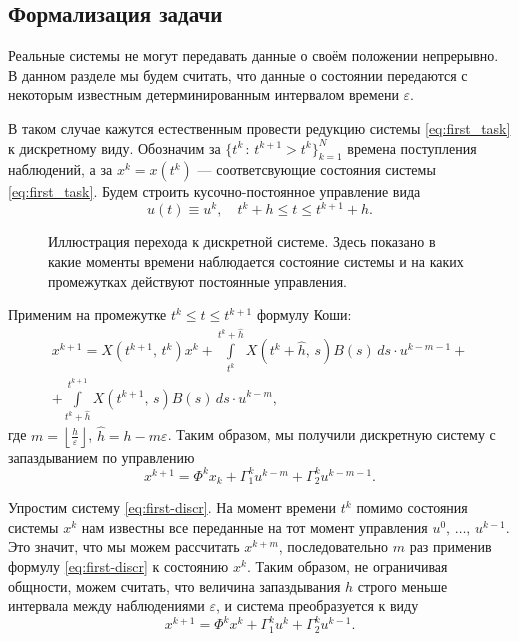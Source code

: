 \subsection{Формализация задачи}

Реальные системы не могут передавать данные о своём положении непрерывно.
В данном разделе мы будем считать, что данные о состоянии передаются с некоторым известным детерминированным интервалом времени $\varepsilon$.

В таком случае кажутся естественным провести редукцию системы \eqref{eq:first_task} к дискретному виду.
Обозначим за $\{t^k\,:\,t^{k+1} > t^k\}_{k=1}^N$ времена поступления наблюдений, а за $x^k = x(t^k)$ --- соответсвующие состояния системы \eqref{eq:first_task}.
Будем строить кусочно-постоянное управление вида
$$
        u(t) \equiv u^{k},
        \quad
        t^{k} + h \leqslant t \leqslant t^{k+1} + h.
$$

\begin{figure}[h]
        \centering
        
        \caption{Иллюстрация перехода к дискретной системе. Здесь показано в какие моменты времени наблюдается состояние системы и на каких промежутках действуют постоянные управления.}
\end{figure}

Применим на промежутке $t^k \leqslant t \leqslant t^{k+1}$ формулу Коши:
\begin{multline*}
x^{k+1} = X(t^{k+1},\,t^k)x^k
+
\int\limits_{t^k}^{t^{k} + \hat h} X(t^{k} + \hat h,\,s)B(s)\,ds\cdot u^{k-m-1}
+\\+
\int\limits_{t^{k} +\hat h}^{t^{k+1}} X(t^{k+1},\,s)B(s)\,ds\cdot u^{k-m},
\end{multline*}
где $m = \left\lfloor\frac{h}{\varepsilon}\right\rfloor$, $\hat h = h - m\varepsilon$.
Таким образом, мы получили дискретную систему с запаздыванием по управлению
\begin{equation}\label{eq:first-discr}
        x^{k+1} = \Phi^k x_k + \Gamma_1^k u^{k-m} + \Gamma_2^k u^{k-m-1}.
\end{equation}

Упростим систему \eqref{eq:first-discr}. На момент времени $t^k$ помимо состояния системы $x^{k}$ нам известны все переданные на тот момент управления $u^0,\,\ldots,\,u^{k-1}$. Это значит, что мы можем рассчитать $x^{k+m}$, последовательно $m$ раз применив формулу \eqref{eq:first-discr} к состоянию $x^k$. Таким образом, не ограничивая общности, можем считать, что величина запаздывания $h$ строго меньше интервала между наблюдениями $\varepsilon$, и система преобразуется к виду
\begin{equation}\label{eq:main-discr}
        x^{k+1} = \Phi^kx^k + \Gamma_1^ku^k + \Gamma_2^ku^{k-1}.
\end{equation}

